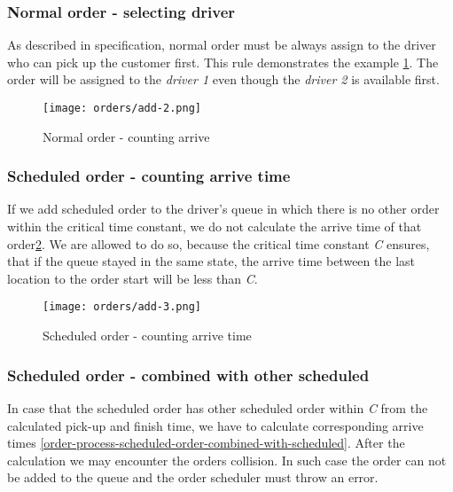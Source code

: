 	\subsubsection{Normal order - selecting driver}
	
		As described in specification, normal order must be always assign to the driver who can pick up the customer first. This rule demonstrates the example  \ref{order-process-normal-order-selecting-driver}. The order will be assigned to the \textit{driver 1} even though the \textit{driver 2} is available first.
			
			\begin{figure}[h]\centering
				\texttt{[image: orders/add-2.png]}
				\caption{Normal order - counting arrive} 
				\label{order-process-normal-order-selecting-driver}
			\end{figure} 
		
	\subsubsection{Scheduled order - counting arrive time}
		If we add scheduled order to the driver's queue in which there is no other order within the critical time constant, we do not calculate the arrive time of that order\ref{order-process-scheduled-order-counting-arrive-time}. We are allowed to do so, because the critical time constant \textit{C} ensures, that if the queue stayed in the same state, the arrive time between the last location to the order start will be less than \textit{C}.
		
		\begin{figure}[h]\centering
			\texttt{[image: orders/add-3.png]}
			\caption{Scheduled order - counting arrive time} 
			\label{order-process-scheduled-order-counting-arrive-time}
		\end{figure} 
	
	
	\subsubsection{Scheduled order - combined with other scheduled}
			In case that the scheduled order has other scheduled order within \textit{C} from the calculated pick-up and finish time, we have to calculate corresponding arrive times \ref{order-process-scheduled-order-combined-with-scheduled}. 
			After the calculation we may encounter the orders collision. In such case the order can not be added to the queue and the order scheduler must throw an error. 
			
